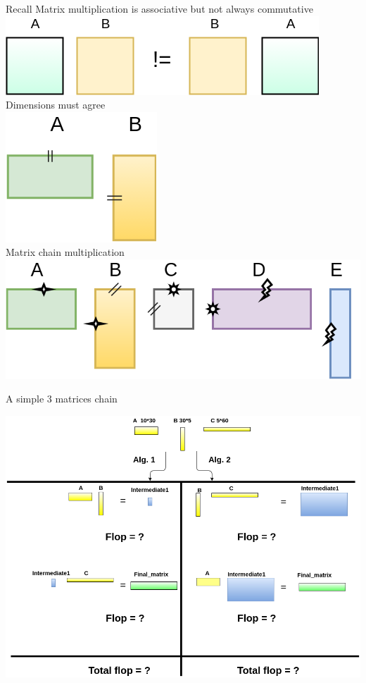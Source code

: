 \documentclass[10pts]{beamer}
\begin{document}
	   
	    \begin{frame}[t]{Recall}
	        Matrix multiplication is associative but not always commutative\\
	    	\includegraphics[scale =0.3]{square_mat_commutation.png}\\
	    	Dimensions must agree\\
	    	\includegraphics[scale =0.3]{matrix_commutation.png}\\
	    	 Matrix chain multiplication \\ 
	    	 	\includegraphics[scale =0.3]{chain_matrix.png}
	    \end{frame}
	    
	    
	   	\begin{frame}{A simple 3 matrices chain}
	   	     \begin{center}
	   	     	\includegraphics[scale =0.3]{3mat_1.png}
	   	     \end{center}
	   	\end{frame}
	   	
\end{document}
